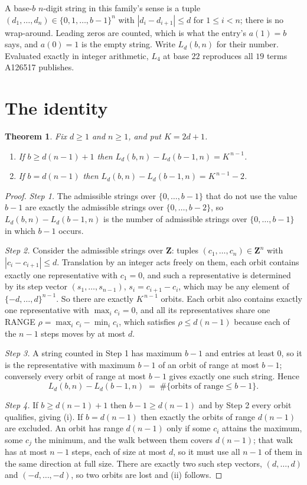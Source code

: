 \documentclass[11pt,a4paper]{article}
\theoremstyle{plain}
\newtheorem{theorem}{Theorem}
\theoremstyle{definition}
\begin{document}
A base-$b$ $n$-digit string in this family's sense is a tuple
$(d_1,\dots,d_n)\in\{0,1,\dots,b-1\}^{n}$ with $|d_i-d_{i+1}|\le d$ for $1\le i<n$; there
is no wrap-around. Leading zeros are counted, which is what the entry's $a(1)=b$ says, and
$a(0)=1$ is the empty string. Write $L_d(b,n)$ for their number. Evaluated exactly in integer
arithmetic, $L_{4}$ at base $22$ reproduces all $19$ terms A126517 publishes.

\section{The identity}

\begin{theorem}
Fix $d\ge1$ and $n\ge1$, and put $K=2d+1$.
\begin{enumerate}
\item[(i)] If $b\ge d(n-1)+1$ then $L_d(b,n)-L_d(b-1,n)=K^{\,n-1}$.
\item[(ii)] If $b=d(n-1)$ then $L_d(b,n)-L_d(b-1,n)=K^{\,n-1}-2$.
\end{enumerate}
\end{theorem}

\begin{proof}
\emph{Step 1.} The admissible strings over $\{0,\dots,b-1\}$ that do not use the value $b-1$
are exactly the admissible strings over $\{0,\dots,b-2\}$, so $L_d(b,n)-L_d(b-1,n)$ is the
number of admissible strings over $\{0,\dots,b-1\}$ in which $b-1$ occurs.

\emph{Step 2.} Consider the admissible strings over $\mathbf{Z}$: tuples
$(c_1,\dots,c_n)\in\mathbf{Z}^{n}$ with $|c_i-c_{i+1}|\le d$. Translation by an integer acts
freely on them, each orbit contains exactly one representative with $c_1=0$, and such a
representative is determined by its step vector $(s_1,\dots,s_{n-1})$, $s_i=c_{i+1}-c_i$,
which may be any element of $\{-d,\dots,d\}^{n-1}$. So there are exactly $K^{\,n-1}$ orbits.
Each orbit also contains exactly one representative with $\max_i c_i=0$, and all its
representatives share one RANGE $\rho=\max_ic_i-\min_ic_i$, which satisfies
$\rho\le d(n-1)$ because each of the $n-1$ steps moves by at most $d$.

\emph{Step 3.} A string counted in Step 1 has maximum $b-1$ and entries at least $0$, so it is
the representative with maximum $b-1$ of an orbit of range at most $b-1$; conversely every orbit
of range at most $b-1$ gives exactly one such string. Hence
\[
L_d(b,n)-L_d(b-1,n)\;=\;\#\{\text{orbits of range}\le b-1\} .
\]

\emph{Step 4.} If $b\ge d(n-1)+1$ then $b-1\ge d(n-1)$ and by Step 2 every orbit qualifies,
giving (i). If $b=d(n-1)$ then exactly the orbits of range $d(n-1)$ are excluded. An orbit has
range $d(n-1)$ only if some $c_i$ attains the maximum, some $c_j$ the minimum, and the walk
between them covers $d(n-1)$; that walk has at most $n-1$ steps, each of size at most $d$, so it
must use all $n-1$ of them in the same direction at full size. There are exactly two such step
vectors, $(d,\dots,d)$ and $(-d,\dots,-d)$, so two orbits are lost and (ii) follows.
\end{proof}
\end{document}
